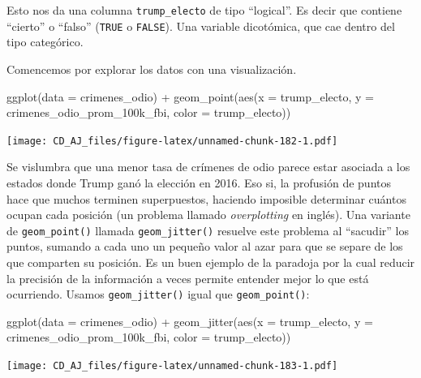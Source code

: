 \documentclass[
]{book}
\newenvironment{Shaded}{\begin{snugshade}}{\end{snugshade}}
\newcommand{\AttributeTok}[1]{\textcolor[rgb]{0.77,0.63,0.00}{#1}}
\newcommand{\FunctionTok}[1]{\textcolor[rgb]{0.00,0.00,0.00}{#1}}
\newcommand{\NormalTok}[1]{#1}
\newcommand{\SpecialCharTok}[1]{\textcolor[rgb]{0.00,0.00,0.00}{#1}}
\begin{document}
Esto nos da una columna \texttt{trump\_electo} de tipo ``logical''. Es decir que contiene ``cierto'' o ``falso'' (\texttt{TRUE} o \texttt{FALSE}). Una variable dicotómica, que cae dentro del tipo categórico.

Comencemos por explorar los datos con una visualización.

\begin{Shaded}
\begin{Highlighting}[]
\FunctionTok{ggplot}\NormalTok{(}\AttributeTok{data =}\NormalTok{ crimenes\_odio) }\SpecialCharTok{+}
    \FunctionTok{geom\_point}\NormalTok{(}\FunctionTok{aes}\NormalTok{(}\AttributeTok{x =}\NormalTok{ trump\_electo, }
                   \AttributeTok{y =}\NormalTok{ crimenes\_odio\_prom\_100k\_fbi, }
                   \AttributeTok{color =}\NormalTok{ trump\_electo)) }
\end{Highlighting}
\end{Shaded}

\texttt{[image: CD\_AJ\_files/figure-latex/unnamed-chunk-182-1.pdf]}

Se vislumbra que una menor tasa de crímenes de odio parece estar asociada a los estados donde Trump ganó la elección en 2016. Eso si, la profusión de puntos hace que muchos terminen superpuestos, haciendo imposible determinar cuántos ocupan cada posición (un problema llamado \emph{overplotting} en inglés). Una variante de \texttt{geom\_point()} llamada \texttt{geom\_jitter()} resuelve este problema al ``sacudir'' los puntos, sumando a cada uno un pequeño valor al azar para que se separe de los que comparten su posición. Es un buen ejemplo de la paradoja por la cual reducir la precisión de la información a veces permite entender mejor lo que está ocurriendo. Usamos \texttt{geom\_jitter()} igual que \texttt{geom\_point()}:

\begin{Shaded}
\begin{Highlighting}[]
\FunctionTok{ggplot}\NormalTok{(}\AttributeTok{data =}\NormalTok{ crimenes\_odio) }\SpecialCharTok{+}
    \FunctionTok{geom\_jitter}\NormalTok{(}\FunctionTok{aes}\NormalTok{(}\AttributeTok{x =}\NormalTok{ trump\_electo, }
                   \AttributeTok{y =}\NormalTok{ crimenes\_odio\_prom\_100k\_fbi, }
                   \AttributeTok{color =}\NormalTok{ trump\_electo))}
\end{Highlighting}
\end{Shaded}

\texttt{[image: CD\_AJ\_files/figure-latex/unnamed-chunk-183-1.pdf]}
\end{document}
